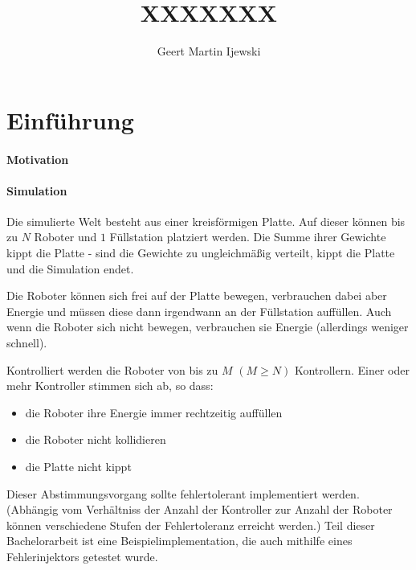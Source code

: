 \documentclass[
    12pt,
    bibliography=totoc,
    ngerman
]{scrartcl}
\title{XXXXXXX}
\author{Geert Martin Ijewski}
\begin{document}
\maketitle
\thispagestyle{empty}

\clearpage
\tableofcontents
\listoffigures
\listoftables

\clearpage
\section{Einf{\"{u}}hrung}

\paragraph{Motivation} 

\paragraph{Simulation} Die simulierte Welt besteht aus einer kreisf{\"{o}}rmigen Platte. Auf dieser k{\"{o}}nnen bis zu $N$ Roboter und $1$ F{\"{u}}llstation
platziert werden. Die Summe ihrer Gewichte kippt die Platte - sind die Gewichte zu ungleichm{\"{a}}{\ss}ig verteilt, kippt
die Platte und die Simulation endet.

Die Roboter k{\"{o}}nnen sich frei auf der Platte bewegen, verbrauchen dabei aber Energie und m{\"{u}}ssen diese dann irgendwann
an der F{\"{u}}llstation auff{\"{u}}llen. Auch wenn die Roboter sich nicht bewegen, verbrauchen sie Energie (allerdings weniger
schnell).

Kontrolliert werden die Roboter von bis zu $M$ $(M \geq N)$ Kontrollern. Einer oder mehr Kontroller stimmen sich ab,
so dass:
\begin{itemize}
\item die Roboter ihre Energie immer rechtzeitig auff{\"{u}}llen
\item die Roboter nicht kollidieren
\item die Platte nicht kippt
\end{itemize}

Dieser Abstimmungsvorgang sollte fehlertolerant implementiert werden. (Abh{\"{a}}ngig vom Verh{\"{a}}ltniss der Anzahl der Kontroller zur
Anzahl der Roboter k{\"{o}}nnen verschiedene Stufen der Fehlertoleranz erreicht werden.\cite[s.149]{Werner00}) Teil dieser Bachelorarbeit ist eine
Beispielimplementation, die auch mithilfe eines Fehlerinjektors getestet wurde.
\end{document}
